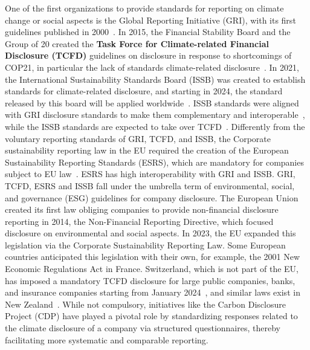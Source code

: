 One of the first organizations to provide standards for reporting on climate change or social aspects is the  Global Reporting Initiative (GRI), with its first guidelines published in 2000~\cite{grihistory}.
In 2015, the Financial Stability Board and the Group of 20 created the \textbf{Task Force for Climate-related Financial Disclosure (TCFD)} guidelines on disclosure in response to shortcomings of COP21, in particular the lack of standards climate-related disclosure~\cite{enwiki:1257716178}.
In 2021, the International Sustainability Standards Board (ISSB) was created to establish standards for climate-related disclosure, and starting in 2024, the standard released by this board will be applied worldwide~\cite{ifrs}. ISSB standards were aligned with GRI disclosure standards to make them complementary and interoperable~\cite{gri}, while the ISSB standards are expected to take over TCFD~\cite{ifrs}.
Differently from the voluntary reporting standards of GRI, TCFD, and ISSB, the Corporate sustainability reporting law in the EU required the creation of the European Sustainability Reporting Standards (ESRS), which are mandatory for companies subject to EU law~\cite{esrs}. ESRS has high interoperability with GRI and ISSB. GRI, TCFD, ESRS and ISSB fall under the umbrella term of environmental, social, and governance (ESG) guidelines for company disclosure. 
The European Union created its first law obliging companies to provide non-financial disclosure reporting in 2014, the Non-Financial Reporting Directive, which focused disclosure on environmental and social aspects. In 2023, the EU expanded this legislation via the Corporate Sustainability Reporting Law. Some European countries anticipated this legislation with their own, for example, the 2001 New Economic Regulations Act in France. Switzerland, which is not part of the EU, has imposed a mandatory TCFD disclosure for large public companies, banks, and insurance companies starting from January 2024~\cite{disclosureswiss}, and similar laws exist in New Zealand~\cite{disclosurezealand}. While not compulsory, initiatives like the Carbon Disclosure Project (CDP) have played a pivotal role by standardizing responses related to the climate disclosure of a company via structured questionnaires, thereby facilitating more systematic and comparable reporting.  



